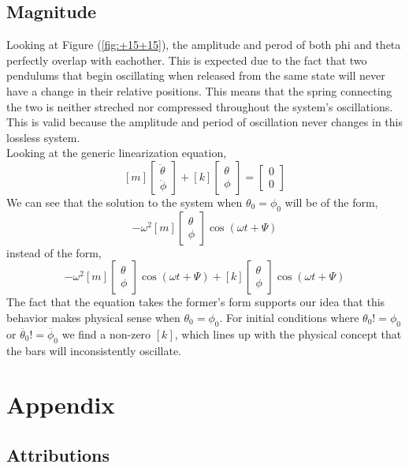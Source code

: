 \documentclass[12pt]{report}
\begin{document}
\begin{flushleft}
\subsection{Magnitude}
Looking at Figure (\ref{fig:+15+15}), the amplitude and perod of both phi and theta perfectly overlap with eachother. This is expected due to the fact that two pendulums that begin oscillating when released from the same state will never have a change in their relative positions. This means that the spring connecting the two is neither streched nor compressed throughout the system's oscillations. This is valid because the amplitude and period of oscillation never changes in this lossless system. \\
Looking at the generic linearization equation,
$$[m] \begin{bmatrix} \ddot{\theta}\\ \ddot{\phi} \end{bmatrix} +
[k] \begin{bmatrix} \theta \\ \phi \end{bmatrix} =
\begin{bmatrix} 0\\ 0 \end{bmatrix}$$
We can see that the solution to the system when $\theta_0 = \phi_0$ will be of the form,
$$-\omega^2[m] \begin{bmatrix} \theta\\ \phi \end{bmatrix} \cos(\omega t + \Psi)$$
instead of the form,
$$-\omega^2[m] \begin{bmatrix} \theta\\ \phi \end{bmatrix} \cos(\omega t + \Psi)
+  [k] \begin{bmatrix} \theta \\ \phi \end{bmatrix} \cos(\omega t + \Psi)$$
The fact that the equation takes the former's form supports our idea that this behavior makes physical sense when $\theta_0 = \phi_0$. For initial conditions where $\theta_0 != \phi_0$ or $\ddot{\theta_0} != \ddot{\phi_0}$ we find a non-zero $[k]$, which lines up with the physical concept that the bars will inconsistently oscillate.
\section{Appendix} \label{appendix}

\subsection{Attributions}


\end{flushleft}
\end{document}
